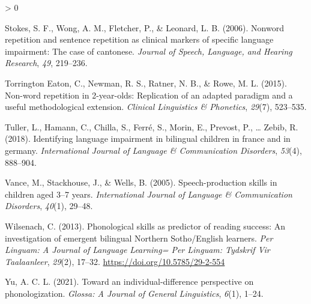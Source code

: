 \documentclass[
  american,
  ,man,floatsintext]{apa6}
\newlength{\cslhangindent}
\newenvironment{CSLReferences}[2] %
 {%
  \setlength{\parindent}{0pt}
  \ifodd #1 \everypar{\setlength{\hangindent}{\cslhangindent}}\ignorespaces\fi
  \ifnum #2 > 0
  \setlength{\parskip}{#2\baselineskip}
  \fi
 }%
 {}
\begin{document}
\begin{CSLReferences}{1}{0}
\leavevmode\hypertarget{ref-stokes2006nonword}{}%
Stokes, S. F., Wong, A. M., Fletcher, P., \& Leonard, L. B. (2006). Nonword repetition and sentence repetition as clinical markers of specific language impairment: The case of cantonese. \emph{Journal of Speech, Language, and Hearing Research}, \emph{49}, 219--236.

\leavevmode\hypertarget{ref-torrington2015non}{}%
Torrington Eaton, C., Newman, R. S., Ratner, N. B., \& Rowe, M. L. (2015). Non-word repetition in 2-year-olds: Replication of an adapted paradigm and a useful methodological extension. \emph{Clinical Linguistics \& Phonetics}, \emph{29}(7), 523--535.

\leavevmode\hypertarget{ref-tuller2018identifying}{}%
Tuller, L., Hamann, C., Chilla, S., Ferré, S., Morin, E., Prevost, P., \ldots{} Zebib, R. (2018). Identifying language impairment in bilingual children in france and in germany. \emph{International Journal of Language \& Communication Disorders}, \emph{53}(4), 888--904.

\leavevmode\hypertarget{ref-vance2005speech}{}%
Vance, M., Stackhouse, J., \& Wells, B. (2005). Speech-production skills in children aged 3--7 years. \emph{International Journal of Language \& Communication Disorders}, \emph{40}(1), 29--48.

\leavevmode\hypertarget{ref-wilsenach2013phonological}{}%
Wilsenach, C. (2013). {Phonological skills as predictor of reading success: An investigation of emergent bilingual Northern Sotho/English learners}. \emph{{Per Linguam: A Journal of Language Learning= Per Linguam: Tydskrif Vir Taalaanleer}}, \emph{29}(2), 17--32. \url{https://doi.org/10.5785/29-2-554}

\leavevmode\hypertarget{ref-yu2021toward}{}%
Yu, A. C. L. (2021). Toward an individual-difference perspective on phonologization. \emph{Glossa: A Journal of General Linguistics}, \emph{6}(1), 1--24.

\end{CSLReferences}
\end{document}
